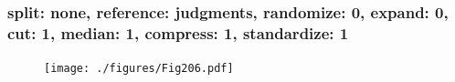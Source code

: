 \begin{frame}\frametitle{\small split: none, reference: judgments, randomize: 0, expand: 0, cut: 1, median: 1, compress: 1, standardize: 1} 
\begin{center} 
\begin{figure} 
\centering 
\texttt{[image: ./figures/Fig206.pdf]} 
\label{spnoRejuRa0Ex0Cu1Me1Co1St1} 
\end{figure} 
\end{center} 
  
  
\end{frame}  
